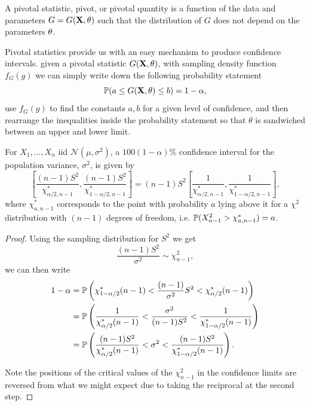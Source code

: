 \documentclass[10pt, a4paper]{article}
\begin{document}
\begin{definition}
    A pivotal statistic,
    pivot,
    or pivotal quantity is a function of the data and parameters $G = G(\mbf{X}, \mbf{\theta})$ such that the distribution of $G$ does not depend on the parameters $\mbf{\theta}$.
\end{definition}

Pivotal statistics provide us with an easy mechanism to produce confidence intervals.
given a pivotal statistic $G(\mbf{X}, \mbf{\theta})$,
with sampling density function $f_{G}(g)$ we can simply write down the following probability statement
\[
\P(a \leq G(\mbf{X}, \mbf{\theta}) \leq b) = 1 - \alpha,
\]
use $f_{G}(g)$ to find the constants $a, b$ for a given level of confidence,
and then rearrange the inequalities inside the probability statement so that $\theta$ is sandwiched between an upper and lower limit.

\begin{proposition}
    For $X_1, \dotsc, X_n$ iid $\mathcal{N}(\mu, \sigma ^ 2)$,
    a $100(1 - \alpha)\%$ confidence interval for the population variance,
    $\sigma ^ 2$,
    is given by
    \[
    \left[\frac{(n - 1)S ^ 2}{\chi_{\alpha / 2, n - 1}^{*}}, \frac{(n - 1)S ^ 2}{\chi_{1 - \alpha / 2, n - 1}^{*}}\right] = (n - 1)S ^ 2\left[\frac{1}{\chi_{\alpha / 2, n - 1}^{*}}, \frac{1}{\chi_{1 - \alpha / 2, n - 1}^{*}}\right],
    \]
    where $\chi_{a, n - 1}^{*}$ corresponds to the point with probability $a$ lying above it for a $\chi ^ 2$ distribution with $(n - 1)$ degrees of freedom,
    i.e.
    $\P(X_{n - 1}^{2} > \chi_{a, n - 1}^{*}) = a$.

    \begin{proof}
        Using the sampling distribution for $S ^ 2$ we get
        \[
        \frac{(n - 1)S ^ 2}{\sigma ^ 2} \sim \chi_{n - 1}^{2},
        \]
        we can then write
        \begin{align*}
            1 - \alpha &= \P\left(\chi_{1 - \alpha / 2}^{*}(n - 1) < \frac{(n - 1)}{\sigma ^ 2}S ^ 2 < \chi_{\alpha / 2}^{*}(n - 1)\right) \\
            &= \P\left(\frac{1}{\chi_{\alpha / 2}^{*}(n - 1)} < \frac{\sigma ^ 2}{(n - 1)S ^ 2} < \frac{1}{\chi_{1 - \alpha / 2}^{*}(n - 1)}\right) \\
            &= \P\left(\frac{(n - 1)S ^ 2}{\chi_{\alpha / 2}^{*}(n - 1)} < \sigma ^ 2 < \frac{(n -  1)S ^ 2}{\chi_{1 - \alpha / 2}^{*}(n - 1)}\right).
        \end{align*}

        Note the positions of the critical values of the $\chi_{n - 1}^{2}$ in the confidence limits are reversed from what we might expect due to taking the reciprocal at the second step.
    \end{proof}
\end{proposition}
\end{document}
